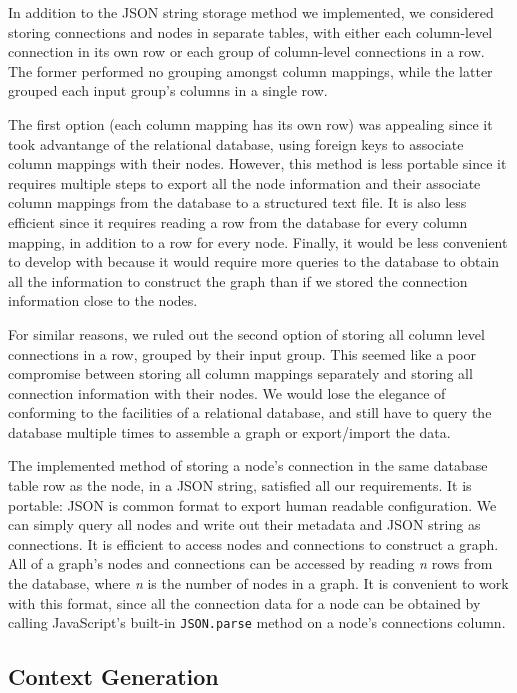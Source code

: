 \documentclass[midd]{thesis}
\begin{document}
In addition to the JSON string storage method we implemented, we considered
storing connections and nodes in separate tables, with either each column-level
connection in its own row or each group of column-level connections in a row.
The former performed no grouping amongst column mappings, while the latter
grouped each input group's columns in a single row.

The first option (each column mapping has its own row) was appealing since it
took advantange of the relational database, using foreign keys to associate
column mappings with their nodes. However, this method is less portable since it
requires multiple steps to export all the node information and their associate
column mappings from the database to a structured text file. It is also less
efficient since it requires reading a row from the database for every column
mapping, in addition to a row for every node. Finally, it would be less
convenient to develop with because it would require more queries to the database
to obtain all the information to construct the graph than if we stored the
connection information close to the nodes.

For similar reasons, we ruled out the second option of storing all column level
connections in a row, grouped by their input group. This seemed like a poor
compromise between storing all column mappings separately and storing all
connection information with their nodes. We would lose the elegance of
conforming to the facilities of a relational database, and still have to query
the database multiple times to assemble a graph or export/import the data.

The implemented method of storing a node's connection in the same database table
row as the node, in a JSON string, satisfied all our requirements. It is
portable: JSON is common format to export human readable configuration. We can
simply query all nodes and write out their metadata and JSON string as
connections. It is efficient to access nodes and connections to construct a
graph. All of a graph's nodes and connections can be accessed by reading
\textit{n} rows from the database, where \textit{n} is the number of nodes in a
graph. It is convenient to work with this format, since all the connection data
for a node can be obtained by calling JavaScript's built-in \texttt{JSON.parse}
method on a node's connections column.

\subsection{Context Generation}
\end{document}
